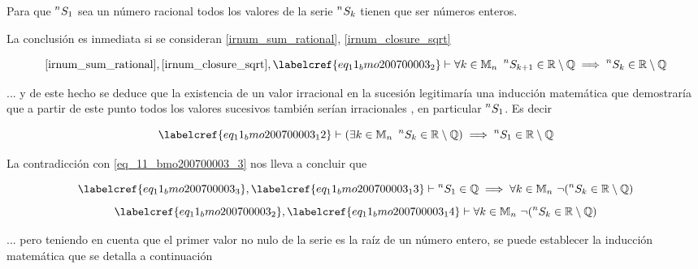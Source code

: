 \begin{claim}
	Para que $\prescript{n}{}{S_1}$ sea un número racional todos los valores de la serie $\prescript{n}{}{S_k}$ tienen que ser números enteros.
\end{claim}

La conclusión es inmediata si se consideran \cref*{irnum_sum_rational}, \cref{irnum_closure_sqrt}

\begin{equation} \label{eq_11_bmo200700003_12}
	\cref{irnum_sum_rational}, \cref{irnum_closure_sqrt}, \labelcref{eq_11_bmo200700003_2} \vdash \forall k \in \mathbb{M}_n\ \prescript{n}{}{S_{k+1}} \in \mathbb{R} \setminus \mathbb{Q} \implies \prescript{n}{}{S_{k}} \in \mathbb{R} \setminus \mathbb{Q}
\end{equation}

... y de este hecho se deduce que la existencia de un valor irracional en la sucesión legitimaría una inducción matemática que demostraría que a partir de este punto todos los valores sucesivos también serían irracionales , en particular $\prescript{n}{}{S_1}$. Es decir 

\begin{equation} \label{eq_11_bmo200700003_13}
	\labelcref{eq_11_bmo200700003_12} \vdash (\exists k \in \mathbb{M}_n\ \prescript{n}{}{S_{k}} \in \mathbb{R} \setminus \mathbb{Q}) \implies \prescript{n}{}{S_{1}} \in \mathbb{R} \setminus \mathbb{Q}
\end{equation}

La contradicción con \cref{eq_11_bmo200700003_3} nos lleva a concluir que 

\begin{equation} \label{eq_11_bmo200700003_14}
	\labelcref{eq_11_bmo200700003_3}, \labelcref{eq_11_bmo200700003_13} \vdash \prescript{n}{}{S_{1}} \in \mathbb{Q} \implies \forall k \in \mathbb{M}_n\ \neg(\prescript{n}{}{S_{k}} \in \mathbb{R} \setminus \mathbb{Q})
\end{equation}
\begin{equation} \label{eq_11_bmo200700003_15}
	\labelcref{eq_11_bmo200700003_2}, \labelcref{eq_11_bmo200700003_14} \vdash \forall k \in \mathbb{M}_n\ \neg(\prescript{n}{}{S_{k}} \in \mathbb{R} \setminus \mathbb{Q})
\end{equation}

... pero teniendo en cuenta que el primer valor no nulo de la serie es la raíz de un número entero, se puede establecer la inducción matemática que se detalla a continuación

